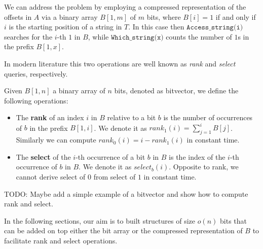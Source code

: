\noindent We can address the problem by employing a compressed representation of the offsets in $A$ via a binary array $B[1,m]$ of $m$ bits, where $B[i] = 1$ if and only if $i$ is the starting position of a string in $T$. In this case then $\texttt{Access\_string(i)}$ searches for the $i$-th $1$ in $B$, while $\texttt{Which\_string(x)}$ counts the number of $1$s in the prefix $B[1,x]$. \vspace{0.4cm}

\noindent In modern literature this two operations are well known as \textit{rank} and \textit{select} queries, respectively.
\begin{definition}\label{def:rankselect}
    Given $B[1,n]$ a binary array of $n$ bits, denoted as bitvector, we define the following operations:
    \begin{itemize}
        \item The \textbf{rank} of an index $i$ in $B$ relative to a bit $b$ is the number of occurrences of $b$ in the prefix $B[1,i]$. We denote it as $rank_1(i) = \sum_{j=1}^{i} B[j]$. Similarly we can compute $rank_0(i) = i - rank_1(i)$ in constant time.
        \item The \textbf{select} of the $i$-th occurrence of a bit $b$ in $B$ is the index of the $i$-th occurrence of $b$ in $B$. We denote it as $select_b(i)$. Opposite to rank, we cannot derive select of $0$ from select of $1$ in constant time.
    \end{itemize}
\end{definition}
\begin{example}
    TODO: Maybe add a simple example of a bitvector and show how to compute rank and select.
\end{example}
\noindent In the following sections, our aim is to built structures of size $o(n)$ bits that can be added on top either the bit array or the compressed representation of $B$ to facilitate rank and select operations. \vspace{0.4cm}

